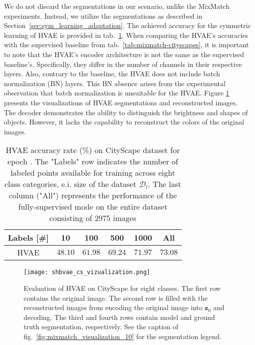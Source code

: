 We do not discard the segmentations in our scenario, unlike the MixMatch experiments. Instead, we utilize the segmentations
as described in Section~\ref{sec:sym_learning_adaptation}. The achieved accuracy for the symmetric learning of HVAE is provided 
in tab.~\ref{tab:hvae-cityscapes-acc}. When comparing the HVAE's accuracies with the supervised baseline from 
tab.~\ref{tab:mixmatch-cityscapes}, it is important to note that the HVAE's encoder architecture is not the same 
as the supervised baseline's. Specifically, they differ in the number of channels in their respective layers. 
Also, contrary to the baseline, the HVAE does not include batch normalization (BN) layers. This BN absence arises from the experimental observation
that batch normalization is unsuitable for the HVAE. Figure \ref{fig:hvae-cs} presents the visualizations of HVAE segmentations and reconstructed 
images. The decoder demonstrates the ability to distinguish the brightness and shapes of objects. However, it lacks the capability to reconstruct the 
colors of the original images.
\begin{table}[tbh]
    \begin{tabular}{|c|c|c|c|c|c|}
    \hline
    Labels [\#]  & 10 & 100 & 500 & 1000 & All \\
    \hline
    HVAE & $48.10$ & $61.98$ & $69.24$ & $71.97$ & $73.08$ \\
    \hline
    \end{tabular}
    \caption[HVAE plain accuracy on CityScape]{HVAE accuracy rate (\%) on CityScape dataset for epoch \todo{}. The 
    "Labels" row indicates the number of labeled points available for training across eight class categories, e.i. size of the dataset $\mathcal{D}_l$. The last 
    column ("All") represents the performance of the fully-supervised mode on the entire dataset consisting of 2975 images}
    \label{tab:hvae-cityscapes-acc}
\end{table}

\begin{figure}[t]
    \centering
    \texttt{[image: shbvae\_cs\_vizualization.png]}
    \caption[Symmetric learning HVAE CityScape results]{Evaluation of HVAE on CityScape for eight classes. The first row contains the original image. The second row is filled with the reconstructed
    images from encoding the original image into $\mathbf{z}_0$ and decoding. The third and fourth rows contain model and ground truth segmentation, respectively.
    See the caption of fig.~\ref{fig:mixmatch_visualization_10} for the segmentation legend.}
    \label{fig:hvae-cs}
\end{figure}


